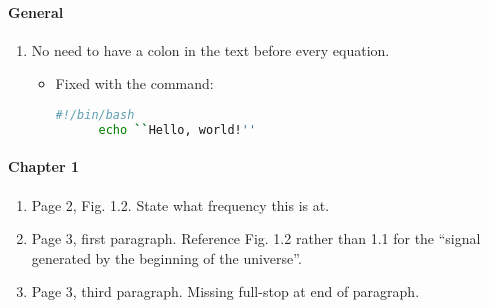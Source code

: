 \documentclass[11pt]{article}
\begin{document}

\paragraph{General}
\begin{enumerate}
\item No need to have a colon in the text before every equation.
  \begin{itemize}
    \item Fixed with the command:
      \begin{lstlisting}[language=bash]
      #!/bin/bash
      echo ``Hello, world!''
      \end{lstlisting}
  \end{itemize}
\end{enumerate}

\paragraph{Chapter 1}
\begin{enumerate}
\item Page 2, Fig. 1.2. State what frequency this is at.
\item Page 3, first paragraph. Reference Fig. 1.2 rather than 1.1 for
  the ``signal generated by the beginning of the universe''.
\item Page 3, third paragraph. Missing full-stop at end of paragraph.
\end{enumerate}
\end{document}
